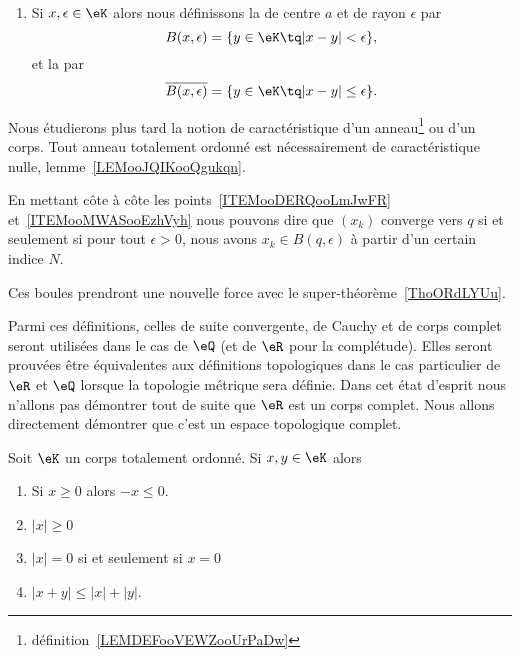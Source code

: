 \begin{definition}
\begin{enumerate}
        \item       \label{ITEMooMWASooEzhVyh}
            Si \( x,\epsilon\in \eK\) alors nous définissons la  de centre \( a\) et de rayon \( \epsilon\) par
            \begin{equation}
                B(x,\epsilon)=\{ y\in \eK\tq | x-y |<\epsilon \},
            \end{equation}
            et la  par
            \begin{equation}
                \overline{ B(x,\epsilon) }=\{ y\in \eK\tq | x-y |\leq \epsilon \}.
            \end{equation}

    \end{enumerate}
\end{definition}

\begin{remark}
    Nous étudierons plus tard la notion de caractéristique d'un anneau\footnote{définition~\ref{LEMDEFooVEWZooUrPaDw}} ou d'un corps. Tout anneau totalement ordonné est nécessairement de caractéristique nulle, lemme~\ref{LEMooJQIKooQgukqn}.
\end{remark}

\begin{remark}
    En mettant côte à côte les points~\ref{ITEMooDERQooLmJwFR} et~\ref{ITEMooMWASooEzhVyh} nous pouvons dire que \( (x_k)\) converge vers \( q\) si et seulement si pour tout \( \epsilon>0\), nous avons \( x_k\in B(q,\epsilon)\) à partir d'un certain indice \( N\).

    Ces boules prendront une nouvelle force avec le super-théorème~\ref{ThoORdLYUu}.
\end{remark}

Parmi ces définitions, celles de suite convergente, de Cauchy et de corps complet seront utilisées dans le cas de \( \eQ\) (et de \( \eR\) pour la complétude). Elles seront prouvées être équivalentes aux définitions topologiques dans le cas particulier de \( \eR\) et \( \eQ\) lorsque la topologie métrique sera définie. Dans cet état d'esprit nous n'allons pas démontrer tout de suite que \( \eR\) est un corps complet. Nous allons directement démontrer que c'est un espace topologique complet.

\begin{lemma}  \label{LemooANTJooYxQZDw}
    Soit \( \eK\) un corps totalement ordonné. Si \( x,y\in \eK\) alors
    \begin{enumerate}
        \item       \label{ItemooNVDIooSuiSoB}
            Si \( x\geq 0\) alors \( -x\leq 0\).
        \item
            \( | x |\geq 0\)
        \item
            \( | x |=0\) si et seulement si \( x=0\)
        \item\label{ItemooOMKNooRlanvk}
            \( | x+y |\leq | x |+| y |\).
    \end{enumerate}
\end{lemma}

